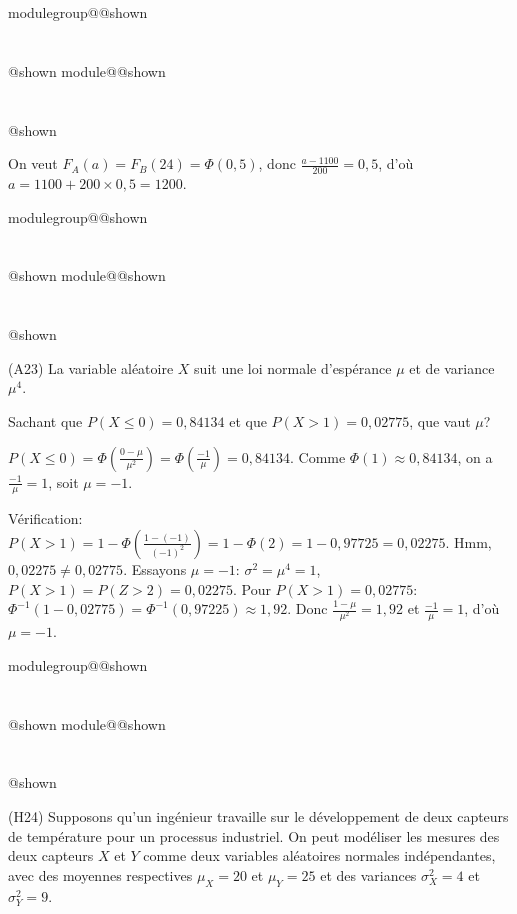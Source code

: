 \documentclass{Evaluation}
\makeatletter
\newcommand{\currentmodulekey}{}
\newcommand{\currentmoduletitle}{}
\newcommand{\currentgroupkey}{}
\newcommand{\currentgrouptitle}{}
\newcommand{\showmoduleifneeded}{%
  \ifx\currentgroupkey\empty\else
    \expandafter\ifx\csname modulegroup@\currentgroupkey @shown\endcsname\relax
      \section*{\currentgrouptitle}%
      \expandafter\gdef\csname modulegroup@\currentgroupkey @shown\endcsname{1}%
    \fi
  \fi
  \expandafter\ifx\csname module@\currentmodulekey @shown\endcsname\relax
    \section*{\currentmoduletitle}%
    \expandafter\gdef\csname module@\currentmodulekey @shown\endcsname{1}%
  \fi
}
\newenvironment{A23}{\showmoduleifneeded}{}
\newenvironment{H24}{\showmoduleifneeded}{}
\makeatother
\begin{document}
\begin{questions}
\begin{A23}
\begin{parts}
\begin{solution}
    On veut $F_A(a)=F_B(24)=\Phi(0,5)$, donc $\frac{a-1100}{200}=0,5$, d'où $a=1100+200\times 0,5=1200$.
\end{solution}
\end{parts}
\end{A23}

\begin{A23}
\question  (A23) La variable aléatoire $X$ suit une loi normale d'espérance $\mu$ et de variance $\mu^4$.

Sachant que $P(X\leq 0)= 0,84134$ et que $P(X> 1)= 0,02775$, que vaut $\mu$?

\begin{solution}
    $P(X\leq 0)=\Phi\left(\frac{0-\mu}{\mu^2}\right)=\Phi\left(\frac{-1}{\mu}\right)=0,84134$. Comme $\Phi(1)\approx 0,84134$, on a $\frac{-1}{\mu}=1$, soit $\mu=-1$.

    Vérification: $P(X>1)=1-\Phi\left(\frac{1-(-1)}{(-1)^2}\right)=1-\Phi(2)=1-0,97725=0,02275$. Hmm, $0,02275\neq 0,02775$. Essayons $\mu=-1$: $\sigma^2=\mu^4=1$, $P(X>1)=P(Z>2)=0,02275$. Pour $P(X>1)=0,02775$: $\Phi^{-1}(1-0,02775)=\Phi^{-1}(0,97225)\approx 1,92$. Donc $\frac{1-\mu}{\mu^2}=1,92$ et $\frac{-1}{\mu}=1$, d'où $\mu=-1$.
\end{solution}
\end{A23}

\begin{H24}
\question (H24)
Supposons qu'un ingénieur travaille sur le développement de deux capteurs de température pour un processus industriel. On peut modéliser les mesures des deux capteurs $X$ et $Y$ comme deux variables aléatoires normales indépendantes, avec des moyennes respectives \( \mu_X = 20 \) et \( \mu_Y = 25 \) et des variances \( \sigma_X^2 = 4 \) et \( \sigma_Y^2 =9\).\\

\end{H24}
\end{questions}
\end{document}
